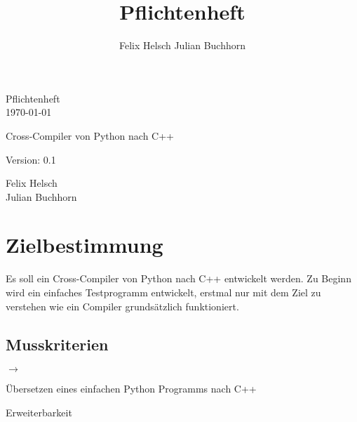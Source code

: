 \documentclass[10pt,a4paper]{article}
\author{Felix Helsch Julian Buchhorn}
\title{Pflichtenheft}
\begin{document}
	\begin{titlepage}
	
		\begin{center}
		
			\begin{Huge}
				\vspace*{80px}
				Pflichtenheft \\
				\vspace*{25px}
				\today
				\vspace*{50px}
			\end{Huge}
			
			\begin{huge}
				Cross-Compiler von Python nach C++
				\vspace*{25px}
			\end{huge}
			
			\begin{large}
				Version: 0.1
				\vspace*{50px}
			\end{large}		
			
			\begin{large}
				Felix Helsch \\
				Julian Buchhorn
			\end{large}									
			
		\end{center}
		
	\end{titlepage}
	
	\tableofcontents
	
	\newpage
	
	\section{Zielbestimmung}
	
	Es soll ein Cross-Compiler von Python nach C++ entwickelt werden. 
	Zu Beginn wird ein einfaches Testprogramm entwickelt, erstmal nur mit 
	dem Ziel zu verstehen wie ein Compiler grundsätzlich funktioniert. 
	
	\subsection{Musskriterien}
	
	\begin{list}{$\rightarrow$}{}
		\item Übersetzen eines einfachen Python Programms nach C++
		\item Erweiterbarkeit
	\end{list}		
	
\end{document}
